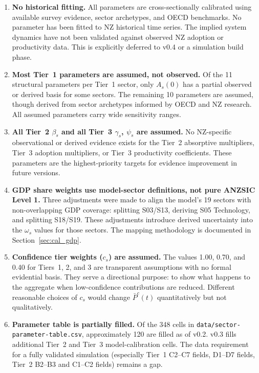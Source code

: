 \documentclass[11pt,a4paper]{article}
\begin{document}
\begin{enumerate}[label=\arabic*.]

  \item \textbf{No historical fitting.}
  All parameters are cross-sectionally calibrated using available survey evidence, sector archetypes, and OECD benchmarks. No parameter has been fitted to NZ historical time series. The implied system dynamics have not been validated against observed NZ adoption or productivity data. This is explicitly deferred to v0.4 or a simulation build phase.

  \item \textbf{Most Tier~1 parameters are assumed, not observed.}
  Of the 11 structural parameters per Tier~1 sector, only $A_s(0)$ has a partial observed or derived basis for some sectors. The remaining 10 parameters are assumed, though derived from sector archetypes informed by OECD and NZ research. All assumed parameters carry wide sensitivity ranges.

  \item \textbf{All Tier~2 $\beta_s$ and all Tier~3 $\gamma_s$, $\psi_s$ are assumed.}
  No NZ-specific observational or derived evidence exists for the Tier~2 absorptive multipliers, Tier~3 adoption multipliers, or Tier~3 productivity coefficients. These parameters are the highest-priority targets for evidence improvement in future versions.

  \item \textbf{GDP share weights use model-sector definitions, not pure ANZSIC Level 1.}
  Three adjustments were made to align the model's 19 sectors with non-overlapping GDP coverage: splitting S03/S13, deriving S05 Technology, and splitting S18/S19. These adjustments introduce derived uncertainty into the $\omega_s$ values for those sectors. The mapping methodology is documented in Section~\ref{sec:cal_gdp}.

  \item \textbf{Confidence tier weights ($c_s$) are assumed.}
  The values 1.00, 0.70, and 0.40 for Tiers~1, 2, and 3 are transparent assumptions with no formal evidential basis. They serve a directional purpose: to show what happens to the aggregate when low-confidence contributions are reduced. Different reasonable choices of $c_s$ would change $\bar{P}^c(t)$ quantitatively but not qualitatively.

  \item \textbf{Parameter table is partially filled.}
  Of the 348 cells in \texttt{data/sector-parameter-table.csv}, approximately 120 are filled as of v0.2. v0.3 fills additional Tier~2 and Tier~3 model-calibration cells. The data requirement for a fully validated simulation (especially Tier~1 C2--C7 fields, D1--D7 fields, Tier~2 B2--B3 and C1--C2 fields) remains a gap.

\end{enumerate}
\end{document}
